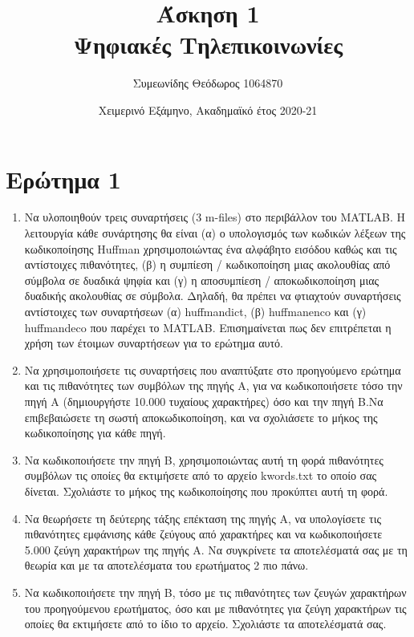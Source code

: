 \documentclass{article}
\title{Άσκηση 1 \\ Ψηφιακές Τηλεπικοινωνίες}
\author{Συμεωνίδης Θεόδωρος 1064870}
\date{Χειμερινό Εξάμηνο, Ακαδημαϊκό έτος 2020-21}
\begin{document}
\maketitle

\newpage

\tableofcontents

\newpage

\colorbox{pink}{\textwidth{Ο κώδικας που γράφτηκε έχει επικολληθεί τέλος της εργασίας.}}


\section{Ερώτημα 1}
\begin{enumerate}
    \item Να υλοποιηθούν τρεις συναρτήσεις (3 m-files) στο περιβάλλον του
    MATLAB. Η λειτουργία κάθε συνάρτησης θα είναι (α) ο υπολογισμός των
    κωδικών λέξεων της κωδικοποίησης Huffman χρησιμοποιώντας ένα
    αλφάβητο εισόδου καθώς και τις αντίστοιχες πιθανότητες, (β) η συμπίεση /
    κωδικοποίηση μιας ακολουθίας από σύμβολα σε δυαδικά ψηφία και (γ) η
    αποσυμπίεση / αποκωδικοποίηση μιας δυαδικής ακολουθίας σε σύμβολα.
    Δηλαδή, θα πρέπει να φτιαχτούν συναρτήσεις αντίστοιχες των
    συναρτήσεων (α) huffmandict, (β) huffmanenco και (γ) huffmandeco που
    παρέχει το MATLAB. Επισημαίνεται πως δεν επιτρέπεται η χρήση των
    έτοιμων συναρτήσεων για το ερώτημα αυτό.
    \item  Να χρησιμοποιήσετε τις συναρτήσεις που αναπτύξατε στο προηγούμενο ερώτημα και τις πιθανότητες των συμβόλων της πηγής Α, για να κωδικοποιήσετε τόσο την πηγή Α (δημιουργήστε 10.000 τυχαίους χαρακτήρες) όσο και την πηγή Β.Να επιβεβαιώσετε τη σωστή αποκωδικοποίηση, και να σχολιάσετε το μήκος της κωδικοποίησης για κάθε πηγή.
    \item Να κωδικοποιήσετε την πηγή Β, χρησιμοποιώντας αυτή τη φορά πιθανότητες συμβόλων τις οποίες θα εκτιμήσετε από το αρχείο kwords.txt το οποίο σας δίνεται. Σχολιάστε το μήκος της κωδικοποίησης που προκύπτει αυτή τη φορά.
    \item Να θεωρήσετε τη δεύτερης τάξης επέκταση της πηγής Α, να υπολογίσετε τις πιθανότητες εμφάνισης κάθε ζεύγους από χαρακτήρες και να κωδικοποιήσετε 5.000 ζεύγη χαρακτήρων της πηγής Α. Να συγκρίνετε τα αποτελέσματά σας με τη θεωρία και με τα αποτελέσματα του ερωτήματος 2 πιο πάνω.
    \item Να κωδικοποιήσετε την πηγή Β, τόσο με τις πιθανότητες των ζευγών χαρακτήρων του προηγούμενου ερωτήματος, όσο και με πιθανότητες για ζεύγη χαρακτήρων τις οποίες θα εκτιμήσετε από το ίδιο το αρχείο. Σχολιάστε τα αποτελέσματά σας.
\end{enumerate}
\end{document}
